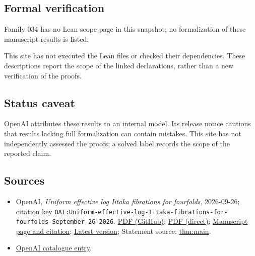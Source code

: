 \documentclass[11pt]{article}
\begin{document}
\subsection{Formal verification}
Family 034 has no Lean scope page in this snapshot; no formalization of these manuscript results is listed.

This site has not executed the Lean files or checked their dependencies. These descriptions report the scope of the linked declarations, rather than a new verification of the proofs.

\subsection{Status caveat}
OpenAI attributes these results to an internal model. Its release notice cautions that results lacking full formalization can contain mistakes. This site has not independently assessed the proofs; a solved label records the scope of the reported claim.

\subsection{Sources}
\begin{itemize}
\item OpenAI, \emph{Uniform effective log Iitaka fibrations for fourfolds}, 2026-09-26; citation key \texttt{OAI:Uniform-effective-log-Iitaka-fibrations-for-fourfolds-September-26-2026}. \href{https://github.com/openai/math/blob/adc7f1241b42e322a6451854ab7e4b4c146bf78a/preprints/Uniform-effective-log-Iitaka-fibrations-for-fourfolds-September-26-2026/paper.pdf}{PDF (GitHub)}; \href{https://github.com/openai/math/raw/adc7f1241b42e322a6451854ab7e4b4c146bf78a/preprints/Uniform-effective-log-Iitaka-fibrations-for-fourfolds-September-26-2026/paper.pdf}{PDF (direct)}; \href{https://github.com/openai/math/blob/adc7f1241b42e322a6451854ab7e4b4c146bf78a/preprints/Uniform-effective-log-Iitaka-fibrations-for-fourfolds-September-26-2026/README.md}{Manuscript page and citation}; \href{https://github.com/openai/math/blob/main/preprints/Uniform-effective-log-Iitaka-fibrations-for-fourfolds-September-26-2026/paper.pdf}{Latest version}; Statement source: \href{https://github.com/openai/math/blob/adc7f1241b42e322a6451854ab7e4b4c146bf78a/preprints/Uniform-effective-log-Iitaka-fibrations-for-fourfolds-September-26-2026/build/sections/introduction.tex\#L52}{thm:main}.
\item \href{https://github.com/openai/math/blob/adc7f1241b42e322a6451854ab7e4b4c146bf78a/CONTENTS.md}{OpenAI catalogue entry}.
\end{itemize}
\end{document}
